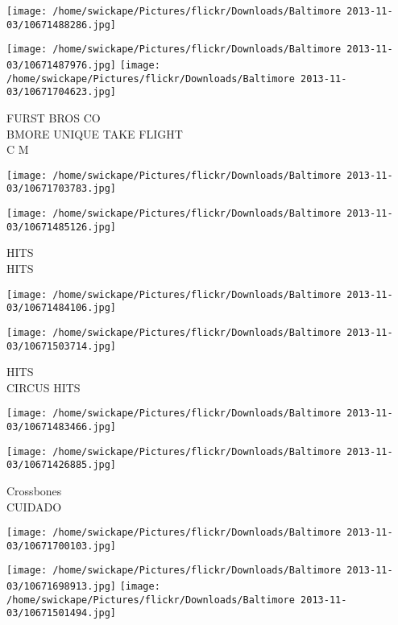 \documentclass[10pt,letterpaper]{article}
\begin{document}
\texttt{[image: /home/swickape/Pictures/flickr/Downloads/Baltimore 2013-11-03/10671488286.jpg]}

\vspace{0.25in}
\texttt{[image: /home/swickape/Pictures/flickr/Downloads/Baltimore 2013-11-03/10671487976.jpg]}
\texttt{[image: /home/swickape/Pictures/flickr/Downloads/Baltimore 2013-11-03/10671704623.jpg]}

FURST BROS CO\\
BMORE UNIQUE TAKE FLIGHT\\
C M\\
\pagebreak

\texttt{[image: /home/swickape/Pictures/flickr/Downloads/Baltimore 2013-11-03/10671703783.jpg]}

\vspace{0.25in}
\texttt{[image: /home/swickape/Pictures/flickr/Downloads/Baltimore 2013-11-03/10671485126.jpg]}

HITS\\
HITS\\
\pagebreak

\texttt{[image: /home/swickape/Pictures/flickr/Downloads/Baltimore 2013-11-03/10671484106.jpg]}

\vspace{0.25in}
\texttt{[image: /home/swickape/Pictures/flickr/Downloads/Baltimore 2013-11-03/10671503714.jpg]}

HITS\\
CIRCUS HITS\\
\pagebreak

\texttt{[image: /home/swickape/Pictures/flickr/Downloads/Baltimore 2013-11-03/10671483466.jpg]}

\vspace{0.25in}
\texttt{[image: /home/swickape/Pictures/flickr/Downloads/Baltimore 2013-11-03/10671426885.jpg]}

Crossbones\\
CUIDADO\\
\pagebreak

\texttt{[image: /home/swickape/Pictures/flickr/Downloads/Baltimore 2013-11-03/10671700103.jpg]}

\vspace{0.25in}
\texttt{[image: /home/swickape/Pictures/flickr/Downloads/Baltimore 2013-11-03/10671698913.jpg]}
\texttt{[image: /home/swickape/Pictures/flickr/Downloads/Baltimore 2013-11-03/10671501494.jpg]}
\end{document}
